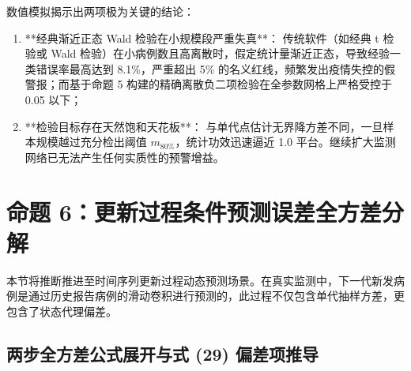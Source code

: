 数值模拟揭示出两项极为关键的结论：
\begin{enumerate}[label=(\arabic*)]
    \item **经典渐近正态 Wald 检验在小规模段严重失真**：
    传统软件（如经典 t 检验或 Wald 检验）在小病例数且高离散时，假定统计量渐近正态，导致经验一类错误率最高达到 8.1\%，严重超出 5\% 的名义红线，频繁发出疫情失控的假警报；而基于命题 5 构建的精确离散负二项检验在全参数网格上严格受控于 0.05 以下；
    \item **检验目标存在天然饱和天花板**：
    与单代点估计无界降方差不同，一旦样本规模越过充分检出阈值 $m_{80\%}$，统计功效迅速逼近 1.0 平台。继续扩大监测网络已无法产生任何实质性的预警增益。
\end{enumerate}

\section{命题 6：更新过程条件预测误差全方差分解}\label{sec:prop6_renewal}

本节将推断推进至时间序列更新过程动态预测场景。在真实监测中，下一代新发病例是通过历史报告病例的滑动卷积进行预测的，此过程不仅包含单代抽样方差，更包含了状态代理偏差。

\subsection{两步全方差公式展开与式 (29) 偏差项推导}

